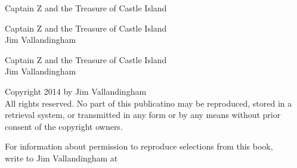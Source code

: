 \documentclass[14pt]{book}
\newcommand\blankpage{%
    \null
    \thispagestyle{empty}%
    \addtocounter{page}{-1}%
    \newpage}
\begin{document}



  \pagestyle{empty}
  \vspace*{\fill}
  \begin{center}
  \huge{Captain Z and the Treasure of Castle Island}\\[0.5cm]
  \end{center}
  \vspace*{\fill}

  \begin{titlepage}
    \vspace*{\fill}
    \begin{center}
      \huge{Captain Z and the Treasure of Castle Island}\\[0.5cm]
      \large {Jim Vallandingham}\\[0.4cm]
    \end{center}
    \vspace*{\fill}
  \end{titlepage}
  
  \begingroup
  \footnotesize
  \parindent 0pt
  \parskip \baselineskip
  \vfill
  Captain Z and the Treasure of Castle Island \\
  Jim Vallandingham \\

  \vfill

  Copyright \textcopyright{} 2014 by Jim Vallandingham \\
  
  All rights reserved. No part of this publicatino may be reproduced, stored in a retrieval system, or transmitted in any form or by any means without prior consent of the copyright owners.

  For information about permission to reproduce selections from this book,\\
  write to Jim Vallandingham at 
\end{document}

